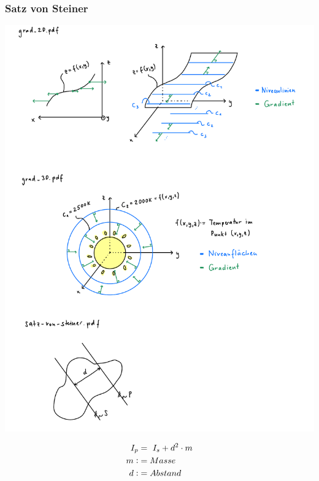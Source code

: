     \subsubsection{Satz von Steiner}
    \begin{minipage}{0.5\linewidth}
        \includegraphics[width=\linewidth]{src/Mehrdimensionale-Funktionen_Integralrechnung/satz-von-steiner.pdf}
    \end{minipage}
    \hspace{0.05\linewidth}
    \begin{minipage}{0.4\linewidth}
        \begin{align*}
            I_p &=\,\, I_s + d^2 \cdot m\\
            m \vcentcolon&= Masse\\
            d \vcentcolon&= Abstand\\
        \end{align*}
    \end{minipage}
